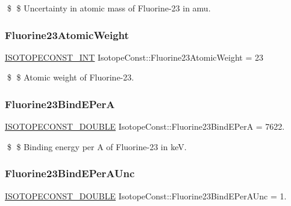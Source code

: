 \$ \$ Uncertainty in atomic mass of Fluorine-\/23 in amu. \mbox{\label{group___isotope_const-_fluorine-_f23_gaa483c90281a962f1179e910a5c34441a}} 
\subsubsection{\texorpdfstring{Fluorine23\+Atomic\+Weight}{Fluorine23AtomicWeight}}
{\footnotesize\ttfamily \mbox{\hyperlink{group___isotope_const-_macros_ga5f18360b3e99483a35c32d789e62621c}{I\+S\+O\+T\+O\+P\+E\+C\+O\+N\+S\+T\+\_\+\+I\+NT}} Isotope\+Const\+::\+Fluorine23\+Atomic\+Weight = 23}

\$ \$ Atomic weight of Fluorine-\/23. \mbox{\label{group___isotope_const-_fluorine-_f23_ga7d4b917e5184787e8eec8aac09723bce}} 
\subsubsection{\texorpdfstring{Fluorine23\+Bind\+E\+PerA}{Fluorine23BindEPerA}}
{\footnotesize\ttfamily \mbox{\hyperlink{group___isotope_const-_macros_ga8f45a7272ce02c0b4c65c44636ed719a}{I\+S\+O\+T\+O\+P\+E\+C\+O\+N\+S\+T\+\_\+\+D\+O\+U\+B\+LE}} Isotope\+Const\+::\+Fluorine23\+Bind\+E\+PerA = 7622.}

\$ \$ Binding energy per A of Fluorine-\/23 in keV. \mbox{\label{group___isotope_const-_fluorine-_f23_ga842193152121c8affdd13578f12154d2}} 
\subsubsection{\texorpdfstring{Fluorine23\+Bind\+E\+Per\+A\+Unc}{Fluorine23BindEPerAUnc}}
{\footnotesize\ttfamily \mbox{\hyperlink{group___isotope_const-_macros_ga8f45a7272ce02c0b4c65c44636ed719a}{I\+S\+O\+T\+O\+P\+E\+C\+O\+N\+S\+T\+\_\+\+D\+O\+U\+B\+LE}} Isotope\+Const\+::\+Fluorine23\+Bind\+E\+Per\+A\+Unc = 1.}

